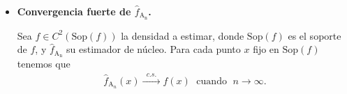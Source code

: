 \begin{itemize}
	\item \textbf{Convergencia fuerte de $\widehat{f}_{\text{A}_\text{n}}$.} 
	\begin{theorem}
		Sea $f \in C^2(\mathrm{Sop}(f))$ la densidad a estimar, donde $\mathrm{Sop}(f)$ es el soporte de $f$, y $\widehat{f}_{\text{A}_\text{n}}$ su estimador de núcleo. Para cada punto $x$ fijo en $\mathrm{Sop}(f)$ tenemos que
		\begin{align}
		\widehat{f}_{\text{A}_n}(x) \xrightarrow{\;\; c.s. \;\; }f(x) \; \text{ cuando } \; n \rightarrow \infty.
		\label{Consistenciac.s.} 
		\end{align}	
\end{theorem}





\end{itemize}
